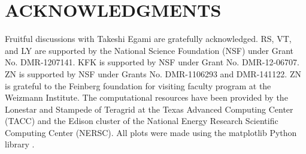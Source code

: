 \documentclass[aps,prl,preprint,showpacs,amsmath,floatfix,superscriptaddress]{revtex4}
\begin{document}
\section*{ACKNOWLEDGMENTS}

Fruitful discussions with Takeshi Egami are gratefully
acknowledged. RS, VT, and LY are supported by the National Science
Foundation (NSF) under Grant No. DMR-1207141. KFK is supported by
NSF under Grant No. DMR-12-06707. ZN is supported by NSF under
Grants No. DMR-1106293 and DMR-141122. ZN is grateful to the
Feinberg foundation for visiting faculty program at the Weizmann
Institute. The computational resources have been provided by the
Lonestar and Stampede of Teragrid at the Texas Advanced Computing
Center (TACC) and the Edison cluster of the National Energy
Research Scientific Computing Center (NERSC). All plots were made
using the matplotlib Python library \cite{matplotlib}.
\end{document}
